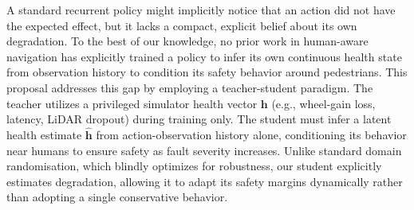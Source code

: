 \documentclass[11pt,a4paper]{article}
\begin{document}
A standard recurrent policy might implicitly notice that an action did not have the expected effect, but it lacks a compact, explicit belief about its own degradation. To the best of our knowledge, no prior work in human-aware navigation has explicitly trained a policy to infer its own continuous health state from observation history to condition its safety behavior around pedestrians. This proposal addresses this gap by employing a teacher-student paradigm. The teacher utilizes a privileged simulator health vector $\mathbf{h}$ (e.g., wheel-gain loss, latency, LiDAR dropout) during training only. The student must infer a latent health estimate $\hat{\mathbf{h}}$ from action-observation history alone, conditioning its behavior near humans to ensure safety as fault severity increases. Unlike standard domain randomisation, which blindly optimizes for robustness, our student explicitly estimates degradation, allowing it to adapt its safety margins dynamically rather than adopting a single conservative behavior.
\end{document}
